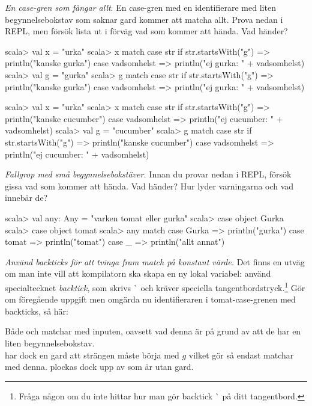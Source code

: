 \Subtask \emph{En case-gren som fångar allt}. En case-gren med en identifierare med liten begynnelsebokstav som saknar gard kommer att matcha allt. Prova nedan i REPL, men försök lista ut i förväg vad som kommer att hända. Vad händer?
\ifswedish
\begin{REPL}
scala> val x = "urka"
scala> x match
         case str if str.startsWith("g") => println("kanske gurka")
         case vadsomhelst => println("ej gurka: " + vadsomhelst)
scala> val g = "gurka"
scala> g match
         case str if str.startsWith("g") => println("kanske gurka")
         case vadsomhelst => println("ej gurka: " + vadsomhelst)
\end{REPL}
\else
\begin{REPL}
scala> val x = "urka"
scala> x match
         case str if str.startsWith("g") => println("kanske cucumber")
         case vadsomhelst => println("ej cucumber: " + vadsomhelst)
scala> val g = "cucumber"
scala> g match
         case str if str.startsWith("g") => println("kanske cucumber")
         case vadsomhelst => println("ej cucumber: " + vadsomhelst)
\end{REPL}
\fi

\Subtask \emph{Fallgrop med små begynnelsebokstäver.} Innan du provar nedan i REPL, försök gissa vad som kommer att hända. Vad händer? Hur lyder varningarna och vad innebär de?
\begin{REPL}
scala> val any: Any = "varken tomat eller gurka"
scala> case object Gurka
scala> case object tomat
scala> any match
         case Gurka => println("gurka")
         case tomat => println("tomat")
         case _ => println("allt annat")
\end{REPL}

\Subtask \emph{Använd backticks för att tvinga fram match på konstant värde.} Det finns en utväg om man inte vill att kompilatorn ska skapa en ny lokal variabel: använd specialtecknet \emph{backtick}, som skrivs \`{} och kräver speciella tangentbordstryck.\footnote{Fråga någon om du inte hittar hur man gör backtick \`{} på ditt tangentbord.}  Gör om föregående uppgift men omgärda nu identifieraren \ifswedish{}\else{}\fi{} i tomat-case-grenen med backticks, så här: \ifswedish{}\else{}\fi



\SOLUTION


\TaskSolved \what


\SubtaskSolved  Både  och  matchar med inputen, oavsett vad denna är på grund av att de har en liten begynnelsebokstav.\\
  har dock en gard att strängen måste börja med $g$ vilket gör så endast \ifswedish{}\else{}\fi{} matchar med denna.  plockas dock upp av  som är utan gard.

